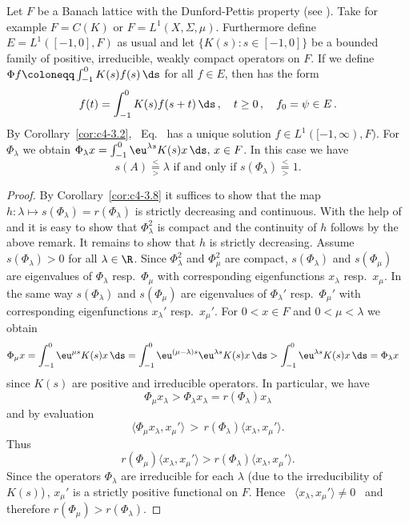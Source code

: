 \begin{example}\label{ex:c4-3.10}
%
Let $F$ be a Banach lattice with the Dunford-Pettis property (see \textcite[Section II.9]{schaefer:1974}).
Take for example $F = C(K)$ or $F = L^{1}(X, \Sigma, \mu)$.
Furthermore define $E = L^{1}([-1,0],F)$ as usual and let $\{K(s) \colon s \in [-1,0]\}$ be a bounded family of positive, irreducible, weakly compact operators on $F$.
If we define $\Phi f \coloneqq \int_{-1}^{0} K(s)f(s) \, \ds$ for all $f \in E$, then 
has the form
\begin{equation}\label{eq:c4-3.11}
f(t) = \int_{-1}^{0} K(s)f(s+t) \, \ds \,, \quad t \geq 0 \,,\quad f_{0} = \psi \in E\,.
\end{equation}
By Corollary~\ref{cor:c4-3.2}, \ Eq.~ has a unique solution $f \in L^{1}([-1,\infty),F)$.
For $\Phi_{\lambda}$ we obtain $\Phi_{\lambda}x = \int_{-1}^{0} \eu^{\lambda s}K(s)x \, \ds,\, x \in F$.
In this case we have 
\[
\text{$s(A) \overset{<}{ \underset{>}{=} } \lambda$  if and only if 
$s(\Phi_{\lambda}) \overset{<}{ \underset{>}{=} } 1$.}
\]
\end{example}
\begin{proof}
By Corollary~\ref{cor:c4-3.8} it suffices to show that the map $h \colon \lambda \mapsto s(\Phi_{\lambda}) = r(\Phi_{\lambda})$ is strictly decreasing and continuous.
With the help of \textcite[Theorem III.11.4]{schaefer:1966} and \textcite[Theorem II.9.9]{schaefer:1974} it is easy to show that $\Phi_{\lambda}^{2}$ is compact and the continuity of\/ $h$ follows by the above remark.
It remains to show that $h$ is strictly decreasing.
Assume $s(\Phi_{\lambda}) > 0$ for all $\lambda \in \R$.
Since $\Phi_{\lambda}^{2}$ and $\Phi_{\mu}^{2}$ are compact, 
$s(\Phi_{\lambda})$ and $s(\Phi_{\mu})$ are eigenvalues of\/ $\Phi_{\lambda}$ resp.\ $\Phi_{\mu}$ with corresponding eigenfunctions $x_{\lambda}$ resp.\ $x_{\mu}$.
In the same way $s(\Phi_{\lambda})$ and $s(\Phi_{\mu})$ are eigenvalues of\/ $\Phi_{\lambda}'$ resp.\ $\Phi_{\mu}'$ with corresponding eigenfunctions $x_{\lambda}'$ resp.\ $x_{\mu}'$.
For $0 < x \in F$ and $0 < \mu < \lambda$ we obtain
\begin{align*}
\Phi_{\mu}x &= \int_{-1}^{0} \eu^{\mu s}K(s)x \, \ds = \int_{-1}^{0} \eu^{(\mu-\lambda) s}\eu^{\lambda s}K(s)x \, \ds > \int_{-1}^{0} \eu^{\lambda s}K(s)x \, \ds = \Phi_{\lambda}x
\end{align*}
since $K(s)$ are positive and irreducible operators.
In particular, we have 
%
\[
	\Phi_{\mu}x_{\lambda} > \Phi_{\lambda}x_{\lambda} = r(\Phi_{\lambda})x_{\lambda}
\]
%
and by evaluation %
\[
	\langle\Phi_{\mu}x_{\lambda},x_{\mu}'\rangle \,>\, r(\Phi_{\lambda})\langle x_{\lambda},x_{\mu}'\rangle .
\]
%
Thus %
\[
	r(\Phi_{\mu})\langle x_{\lambda},x_{\mu}'\rangle > r(\Phi_{\lambda})\langle x_{\lambda},x_{\mu}'\rangle .
\]
%
Since the operators $\Phi_{\lambda}$ are irreducible for each $\lambda$ (due to the irreducibility of\/ $K(s)$)\,, $x_{\mu}'$ is a strictly positive functional on $F$.
Hence \ $\langle x_{\lambda},x_{\mu}'\rangle \neq 0$ \ and therefore
$r(\Phi_{\mu}) > r(\Phi_{\lambda})$.
\end{proof}
